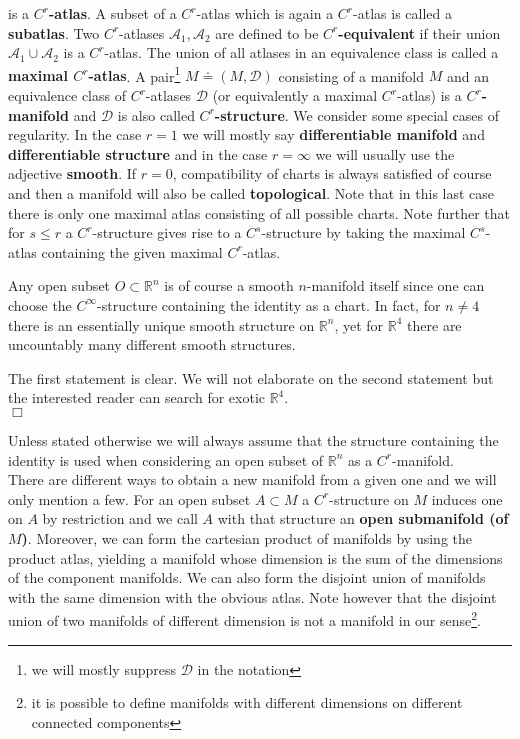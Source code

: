 is a \textbf{$C^{r}$-atlas}. A subset of a $C^{r}$-atlas which is again a $C^{r}$-atlas is called a \textbf{subatlas}. Two $C^{r}$-atlases $\mathcal{A}_{1},\mathcal{A}_{2}$ are defined to be \textbf{$C^{r}$-equivalent} if their union $\mathcal{A}_{1} \cup \mathcal{A}_{2}$ is a $C^{r}$-atlas. The union of all atlases in an equivalence class is called a \textbf{maximal $C^{r}$-atlas}. A pair\footnote{we will mostly suppress $\mathcal{D}$ in the notation} $M \doteq (M,\mathcal{D})$ consisting of a manifold $M$ and an equivalence class of $C^{r}$-atlases $\mathcal{D}$ (or equivalently a maximal $C^{r}$-atlas) is a \textbf{$C^{r}$-manifold} and $\mathcal{D}$ is also called \textbf{$C^{r}$-structure}. We consider some special cases of regularity. In the case $r = 1$ we will mostly say \textbf{differentiable manifold} and \textbf{differentiable structure} and in the case $r = \infty$ we will usually use the adjective \textbf{smooth}. If $r = 0$, compatibility of charts is always satisfied of course and then a manifold will also be called \textbf{topological}. Note that in this last case there is only one maximal atlas consisting of all possible charts. Note further that for $s \leq r$ a $C^{r}$-structure gives rise to a $C^{s}$-structure by taking the maximal $C^{s}$-atlas containing the given maximal $C^{r}$-atlas.
\\
\begin{exa}
\label{exa:mfld}
Any open subset $O \subset \mathbb{R}^{n}$ is of course a smooth $n$-manifold itself since one can choose the $C^{\infty}$-structure containing the identity as a chart. In fact, for $n \neq 4$ there is an essentially unique smooth structure on $\mathbb{R}^{n}$, yet for $\mathbb{R}^{4}$ there are uncountably many different smooth structures.
\end{exa}
\begin{prf}
The first statement is clear. We will not elaborate on the second statement but the interested reader can search for exotic $\mathbb{R}^{4}$.
\\
\phantom{proven}
\hfill
$\Box$
\end{prf}
Unless stated otherwise we will always assume that the structure containing the identity is used when considering an open subset of $\mathbb{R}^{n}$ as a $C^{r}$-manifold.
\\
There are different ways to obtain a new manifold from a given one and we will only mention a few. For an open subset $A \subset M$ a $C^{r}$-structure on $M$ induces one on $A$ by restriction and we call $A$ with that structure an \textbf{open submanifold (of $M$)}. Moreover, we can form the cartesian product of manifolds by using the product atlas, yielding a manifold whose dimension is the sum of the dimensions of the component manifolds. We can also form the disjoint union of manifolds with the same dimension with the obvious atlas. Note however that the disjoint union of two manifolds of different dimension is not a manifold in our sense\footnote{it is possible to define manifolds with different dimensions on different connected components}.
